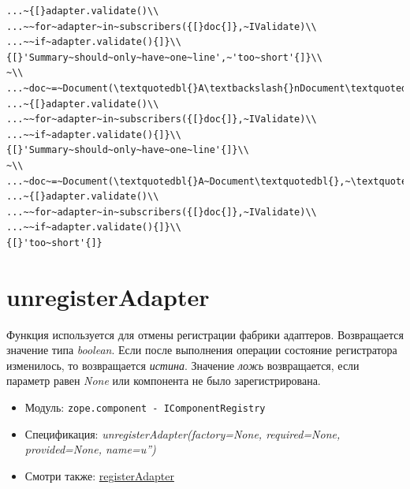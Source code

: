 \documentclass[a4paper,openany,twoside,draft]{book}
\providecommand*{\DUroletitlereference}[1]{\textsl{#1}}
\begin{document}
\begin{verbatim}
...~{[}adapter.validate()\\
...~~for~adapter~in~subscribers({[}doc{]},~IValidate)\\
...~~if~adapter.validate(){]}\\
{[}'Summary~should~only~have~one~line',~'too~short'{]}\\
~\\
...~doc~=~Document(\textquotedbl{}A\textbackslash{}nDocument\textquotedbl{},~\textquotedbl{}blah\textquotedbl{}~*~1000)\\
...~{[}adapter.validate()\\
...~~for~adapter~in~subscribers({[}doc{]},~IValidate)\\
...~~if~adapter.validate(){]}\\
{[}'Summary~should~only~have~one~line'{]}\\
~\\
...~doc~=~Document(\textquotedbl{}A~Document\textquotedbl{},~\textquotedbl{}blah\textquotedbl{})\\
...~{[}adapter.validate()\\
...~~for~adapter~in~subscribers({[}doc{]},~IValidate)\\
...~~if~adapter.validate(){]}\\
{[}'too~short'{]}
\end{verbatim}


\section*{unregisterAdapter%
  \label{unregisteradapter}%
}

Функция используется для отмены регистрации фабрики адаптеров.
Возвращается значение типа \DUroletitlereference{boolean}.  Если после выполнения операции
состояние регистратора изменилось, то возвращается \DUroletitlereference{истина}.  Значение
\DUroletitlereference{ложь} возвращается, если параметр равен \DUroletitlereference{None} или компонента не было
зарегистрирована.

\begin{itemize}

\item Модуль: \texttt{zope.component - IComponentRegistry}

\item Спецификация: \DUroletitlereference{unregisterAdapter(factory=None, required=None,
provided=None, name=u'')}

\item Смотри также: \hyperref[registeradapter]{registerAdapter}

\end{itemize}
\end{document}
